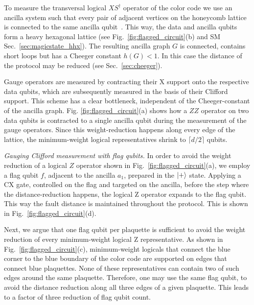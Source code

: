 \documentclass[aps,prx,twocolumn,secnumarabic,superscriptaddress,nofootinbib]{revtex4-2}
\begin{document}
To measure the transversal logical $XS^\dagger$ operator of the color code we use an ancilla system such that every pair of adjacent vertices on the honeycomb lattice is connected to the same ancilla qubit~\cite{williamsonDynamicalQuantumCodes2025}. This way, the data and ancilla qubits form a heavy hexagonal lattice (see Fig.~\ref{fig:flagged_circuit}(b) and SM Sec.~\ref{sec:magicstate_hhx}). The resulting ancilla graph $G$ is connected, contains short loops but has a Cheeger constant $h(G)<1$. In this case the distance of the protocol may be reduced (see Sec.~\ref{sec:cheeger}).

Gauge operators are measured by contracting their X support onto the respective data qubits, which are subsequently measured in the basis of their Clifford support. This scheme has a clear bottleneck, independent of the Cheeger-constant of the ancilla graph. Fig. \ref{fig:flagged_circuit}(a) shows how a $ZZ$ operator on two data qubits is contracted to a single ancilla qubit during the measurement of the gauge operators. Since this weight-reduction happens along every edge of the lattice, the minimum-weight logical representatives shrink to $\lceil d/2\rceil$ qubits.

{\it Gauging Clifford measurement with flag qubits.} In order to avoid the weight reduction of a logical $Z$ operator shown in Fig.~\ref{fig:flagged_circuit}(a), we employ a flag qubit $f$, adjacent to the ancilla $a_1$, prepared in the $\ket{+}$ state. Applying a CX gate, controlled on the flag and targeted on the ancilla, before the step where the distance-reduction happens, the logical Z operator expands to the flag qubit. This way the fault distance is maintained throughout the protocol. This is shown in Fig.~\ref{fig:flagged_circuit}(d).

Next, we argue that one flag qubit per plaquette is sufficient to avoid the weight reduction of every minimum-weight logical Z representative. As shown in Fig.~\ref{fig:flagged_circuit}(c), minimum-weight logicals that connect the blue corner to the blue boundary of the color code are supported on edges that connect blue plaquettes. None of these representatives can contain two of such edges around the same plaquette. Therefore, one may use the same flag qubit, to avoid the distance reduction along all three edges of a given plaquette. This leads to a factor of three reduction of flag qubit count. 
\end{document}
